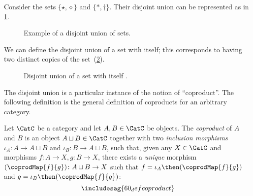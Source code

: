 \begin{example}
Consider the sets $\{\star, \diamond\}$ and $\{\ast, \dagger\}$. Their disjoint union can be represented as in \cref{fig:disjoint}.
\begin{figure}[h!]
    \begin{center}
    \end{center}
    \caption{Example of a disjoint union of sets. \label{fig:disjoint}}
\end{figure}
\end{example}

We can define the disjoint union of a set with itself; this corresponds to having two distinct copies of the set~(\cref{fig:disjointself}).

\begin{figure}[h!]
\begin{center}
    \caption{Disjoint union of a set with itself \label{fig:disjointself}.}
\end{center}
\end{figure}

The disjoint union is a particular instance of the notion of ``coproduct''.
The following definition is the general definition of coproducts for an arbitrary category.

\begin{shaded}
\begin{definition}[Coproduct]
\label{def:catcoproduct}
Let $\CatC$ be a category and let $A, B \in \CatC$ be objects. The \emph{coproduct} of $A$ and $B$ is an object $A \sqcup B \in \CatC$ together with two \emph{inclusion morphisms} $\iota_A \colon A \to A \sqcup B $ and $\iota_B \colon B \to A  \sqcup B $, such that, given any $X \in \CatC$ and morphisms $f\colon  A \to X, g \colon B \to X$, there exists a \emph{unique} morphism $(\coprodMap{f}{g}) \colon A \sqcup B \to X$ such that $f = \iota_A\then (\coprodMap{f}{g})$ and $g = \iota_B \then (\coprodMap{f}{g})$:
\begin{equation}
\includesag{60_defcoproduct}
\end{equation}
\end{definition}
\end{shaded}

